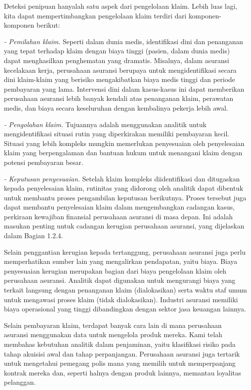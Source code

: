 \documentclass[
]{book}
\begin{document}
Deteksi penipuan hanyalah satu aspek dari pengelolaan klaim. Lebih luas lagi, kita dapat mempertimbangkan pengelolaan klaim terdiri dari komponen-komponen berikut:

\emph{- Pemilahan klaim.} Seperti dalam dunia medis, identifikasi dini dan penanganan yang tepat terhadap klaim dengan biaya tinggi (pasien, dalam dunia medis) dapat menghasilkan penghematan yang dramatis. Misalnya, dalam asuransi kecelakaan kerja, perusahaan asuransi berupaya untuk mengidentifikasi secara dini klaim-klaim yang berisiko mengakibatkan biaya medis tinggi dan periode pembayaran yang lama. Intervensi dini dalam kasus-kasus ini dapat memberikan perusahaan asuransi lebih banyak kendali atas penanganan klaim, perawatan medis, dan biaya secara keseluruhan dengan kembalinya pekerja lebih awal.

\emph{- Pengolahan klaim.} Tujuannya adalah menggunakan analitik untuk mengidentifikasi situasi rutin yang diperkirakan memiliki pembayaran kecil. Situasi yang lebih kompleks mungkin memerlukan penyesuaian oleh penyelesaian klaim yang berpengalaman dan bantuan hukum untuk menangani klaim dengan potensi pembayaran besar.

\emph{- Keputusan penyesuaian.} Setelah klaim kompleks diidentifikasi dan ditugaskan kepada penyelesaian klaim, rutinitas yang didorong oleh analitik dapat dibentuk untuk membantu proses pengambilan keputusan berikutnya. Proses tersebut juga dapat membantu penyelesaian klaim dalam mengembangkan cadangan kasus, perkiraan kewajiban finansial perusahaan asuransi di masa depan. Ini adalah masukan penting untuk cadangan kerugian perusahaan asuransi, yang dijelaskan dalam Bagian 1.2.4.

Selain penggantian kerugian kepada tertanggung, perusahaan asuransi juga perlu memperhatikan sumber lain yang mengalirkan pendapatan, yaitu biaya. Biaya penyesuaian kerugian merupakan bagian dari biaya pengelolaan klaim oleh perusahaan asuransi. Analitik dapat digunakan untuk mengurangi biaya yang terkait langsung dengan penanganan klaim (dialokasikan) serta waktu staf umum untuk mengawasi proses klaim (tidak dialokasikan). Industri asuransi memiliki biaya operasional yang tinggi dibandingkan dengan sektor jasa keuangan lainnya.

Selain pembayaran klaim, terdapat banyak cara lain di mana perusahaan asuransi menggunakan data untuk mengelola produk mereka. Kami telah membahas kebutuhan analitik dalam penjaminan, yaitu klasifikasi risiko pada tahap akuisisi awal dan tahap perpanjangan. Perusahaan asuransi juga tertarik untuk mengetahui pemegang polis mana yang memilih untuk memperpanjang kontrak mereka dan, seperti halnya dengan produk lainnya, memantau loyalitas pelanggan.
\end{document}
